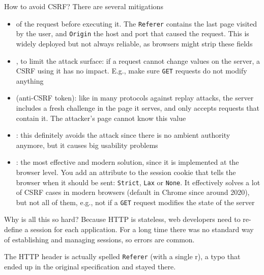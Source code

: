 \begin{parag}{How to avoid CSRF?}
    There are several mitigations
    \begin{itemize}
        \item {} of the request before executing it. The \texttt{Referer} contains the last page visited by the user, and \texttt{Origin} the host and port that caused the request. This is widely deployed but not always reliable, as browsers might strip these fields
        \item {}, to limit the attack surface: if a request cannot change values on the server, a CSRF using it has no impact. E.g., make sure \texttt{GET} requests do not modify anything
        \item {} (anti-CSRF token): like in many protocols against replay attacks, the server includes a fresh challenge in the page it serves, and only accepts requests that contain it. The attacker's page cannot know this value
        \item {}: this definitely avoids the attack since there is no ambient authority anymore, but it causes big usability problems
        \item {}: the most effective and modern solution, since it is implemented at the browser level. You add an attribute to the session cookie that tells the browser when it should be sent: \texttt{Strict}, \texttt{Lax} or \texttt{None}. It effectively solves a lot of CSRF cases in modern browsers (default in Chrome since around 2020), but not all of them, e.g., not if a \texttt{GET} request modifies the state of the server
    \end{itemize}
    \begin{subparag}{Why is all this so hard?}
        Because HTTP is stateless, web developers need to re-define a session for each application. For a long time there was no standard way of establishing and managing sessions, so errors are common.
    \end{subparag}
\end{parag}

\begin{framedremark}
    The HTTP header is actually spelled \texttt{Referer} (with a single r), a typo that ended up in the original specification and stayed there.
\end{framedremark}

